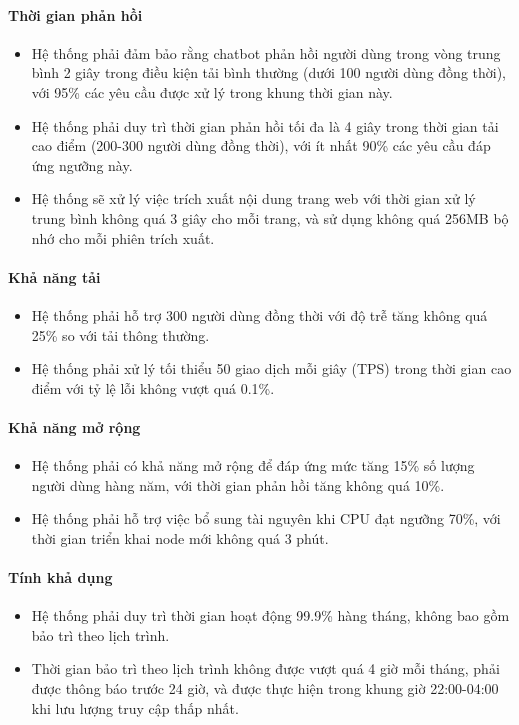 \paragraph{Thời gian phản hồi} 
\begin{itemize} 
    \item Hệ thống phải đảm bảo rằng chatbot phản hồi người dùng trong vòng trung bình 2 giây trong điều kiện tải bình thường (dưới 100 người dùng đồng thời), với 95\% các yêu cầu được xử lý trong khung thời gian này. 
    \item Hệ thống phải duy trì thời gian phản hồi tối đa là 4 giây trong thời gian tải cao điểm (200-300 người dùng đồng thời), với ít nhất 90\% các yêu cầu đáp ứng ngưỡng này. 
    \item Hệ thống sẽ xử lý việc trích xuất nội dung trang web với thời gian xử lý trung bình không quá 3 giây cho mỗi trang, và sử dụng không quá 256MB bộ nhớ cho mỗi phiên trích xuất. 
\end{itemize}

\paragraph{Khả năng tải}
\begin{itemize} 
    \item Hệ thống phải hỗ trợ 300 người dùng đồng thời với độ trễ tăng không quá 25\% so với tải thông thường. 
    \item Hệ thống phải xử lý tối thiểu 50 giao dịch mỗi giây (TPS) trong thời gian cao điểm với tỷ lệ lỗi không vượt quá 0.1\%. 
\end{itemize}

\paragraph{Khả năng mở rộng}
\begin{itemize}
    \item Hệ thống phải có khả năng mở rộng để đáp ứng mức tăng 15\% số lượng người dùng hàng năm, với thời gian phản hồi tăng không quá 10\%.
    \item Hệ thống phải hỗ trợ việc bổ sung tài nguyên khi CPU đạt ngưỡng 70\%, với thời gian triển khai node mới không quá 3 phút.
\end{itemize}

\paragraph{Tính khả dụng}
\begin{itemize}
    \item Hệ thống phải duy trì thời gian hoạt động 99.9\% hàng tháng, không bao gồm bảo trì theo lịch trình.
    \item Thời gian bảo trì theo lịch trình không được vượt quá 4 giờ mỗi tháng, phải được thông báo trước 24 giờ, và được thực hiện trong khung giờ 22:00-04:00 khi lưu lượng truy cập thấp nhất.
\end{itemize}


